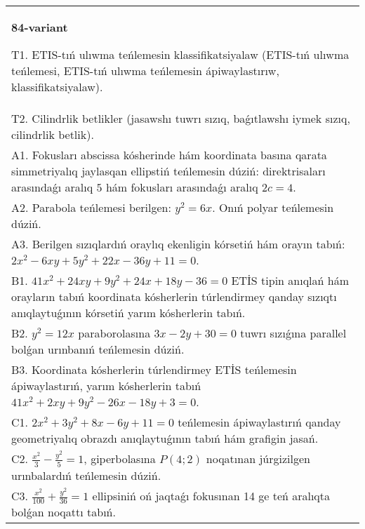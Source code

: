 \documentclass{article}
\begin{document}
\begin{tabular}{m{17cm}}
\textbf{84-variant}
\newline

T1. ETIS-tıń ulıwma teńlemesin klassifikatsiyalaw (ETIS-tıń ulıwma teńlemesi, ETIS-tıń ulıwma teńlemesin ápiwaylastırıw, klassifikatsiyalaw).\\

T2. Cilindrlik betlikler (jasawshı tuwrı sızıq, baǵıtlawshı iymek sızıq, cilindrlik betlik).\\

A1. Fokusları abscissa kósherinde hám koordinata basına qarata simmetriyalıq jaylasqan ellipstiń teńlemesin dúziń: direktrisaları arasındaǵı aralıq $5$ hám fokusları arasındaǵı aralıq $2 c=4$.\\

A2. Parabola teńlemesi berilgen: $y^2=6 x$. Onıń polyar teńlemesin dúziń.\\

A3. Berilgen sızıqlardıń oraylıq ekenligin kórsetiń hám orayın tabıń: $2 x^{2}-6 xy+5 y^{2}+22 x-36 y+11=0$.\\

B1. $41x^{2} + 24xy + 9y^{2} + 24x + 18y - 36 = 0$ ETİS tipin anıqlań hám orayların tabıń koordinata kósherlerin túrlendirmey qanday sızıqtı anıqlaytuǵının kórsetiń yarım kósherlerin tabıń.  \\

B2. $y^{2} = 12x$ paraborolasına $3x - 2y + 30 = 0$ tuwrı sızıǵına parallel bolǵan urınbanıń teńlemesin dúziń.  \\

B3. Koordinata kósherlerin túrlendirmey ETİS teńlemesin ápiwaylastırıń, yarım kósherlerin tabıń $41x^{2} + 2xy + 9y^{2} - 26x - 18y + 3 = 0$.  \\

C1. $2x^{2} + 3y^{2} + 8x - 6y + 11 = 0$ teńlemesin ápiwaylastırıń qanday geometriyalıq obrazdı anıqlaytuǵının tabıń hám grafigin jasań.  \\

C2. $\frac{x^{2}}{3} - \frac{y^{2}}{5} = 1$, giperbolasına $P(4;2)$ noqatınan júrgizilgen urınbalardıń teńlemesin dúziń.  \\

C3. $\frac{x^{2}}{100} + \frac{y^{2}}{36} = 1$ ellipsiniń oń jaqtaǵı fokusınan 14 ge teń aralıqta bolǵan noqattı tabıń.  \\

\end{tabular}
\vspace{1cm}
\end{document}

